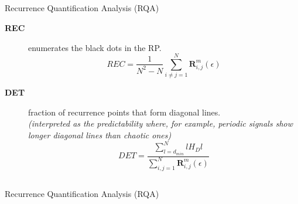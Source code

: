 {{\subsection{}
{

\begin{frame}{Recurrence Quantification Analysis (RQA)}

\begin{description}
\item [ \textbf{REC} ] enumerates the black dots in the RP.
\begin{equation*}
	REC= 
	\frac{1}{N^2 - N} \sum^{N}_{i \neq j = 1} 
	\mathbf{R}^{m}_{i,j}(\epsilon)
\end{equation*}
\item [ \textbf{DET} ] fraction of recurrence points that form diagonal lines. \\
			\textit{(interpreted as the predictability where, for example,
				periodic signals show longer diagonal lines 
				than chaotic ones)}
\begin{equation*}
	DET=\frac{\sum^{N}_{l=d_{min}} l H_D{l} }{\sum^{N}_{i,j=1} 
	\mathbf{R}^{m}_{i,j}(\epsilon) }
\end{equation*}

\end{description}


	
\end{frame}
}





\subsection{}
{

\begin{frame}{Recurrence Quantification Analysis (RQA)}


\end{frame}}}}
